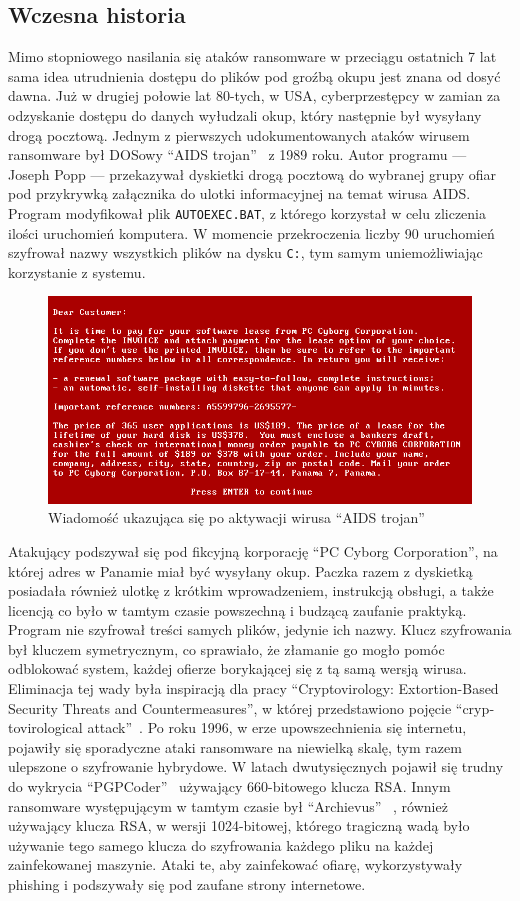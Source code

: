 \subsection{Wczesna historia}
Mimo stopniowego nasilania się ataków ransomware w przeciągu ostatnich 7 lat sama idea utrudnienia
dostępu do plików pod groźbą okupu jest znana od dosyć dawna. Już w drugiej połowie lat 80-tych, w USA,
cyberprzestępcy w zamian za odzyskanie dostępu do danych wyłudzali okup, który następnie był wysyłany drogą pocztową. Jednym z pierwszych udokumentowanych ataków wirusem ransomware był DOSowy \foreignquote{english}{AIDS trojan}~\cite{virus_1990} z 1989 roku. Autor programu — Joseph Popp — przekazywał dyskietki drogą pocztową do wybranej grupy ofiar pod przykrywką załącznika do ulotki informacyjnej na temat wirusa AIDS. Program modyfikował plik \texttt{AUTOEXEC.BAT}, z którego korzystał w celu zliczenia ilości uruchomień komputera. W momencie przekroczenia liczby 90 uruchomień szyfrował nazwy wszystkich plików na dysku \texttt{C:\/}, tym samym uniemożliwiając korzystanie z systemu.
\begin{figure}[H]
    \centering
    \includegraphics[width=0.6\linewidth]{rysunki/aids-trojan.png}
    \caption{Wiadomość ukazująca się po aktywacji wirusa \foreignquote{english}{AIDS trojan}}
    \label{fig:enter-label}
\end{figure}
Atakujący podszywał się pod fikcyjną korporację \foreignquote{english}{PC Cyborg Corporation}, na której adres w Panamie miał być wysyłany okup. Paczka razem z dyskietką posiadała również ulotkę z krótkim wprowadzeniem, instrukcją obsługi, a także licencją co było w tamtym czasie powszechną i budzącą zaufanie praktyką. 
Program nie szyfrował treści samych plików, jedynie ich nazwy. Klucz szyfrowania był kluczem symetrycznym, co sprawiało, że złamanie go mogło pomóc odblokować system, każdej ofierze borykającej się z tą samą wersją wirusa. Eliminacja tej wady była inspiracją dla pracy \foreignquote{english}{Cryptovirology: Extortion-Based Security Threats and Countermeasures}, w której przedstawiono pojęcie \foreignquote{english}{cryptovirological attack}~\cite{yung}.
\newline
Po roku 1996, w erze upowszechnienia się internetu, pojawiły się sporadyczne ataki ransomware na niewielką skalę, tym razem ulepszone o szyfrowanie hybrydowe. W latach dwutysięcznych pojawił się trudny do wykrycia \foreignquote{english}{PGPCoder}~\cite{tromer_cryptanalysis_nodate} używający 660-bitowego klucza RSA. Innym ransomware występującym w tamtym czasie był \foreignquote{english}{Archievus} ~\cite{arhiveus}, również używający klucza RSA, w wersji 1024-bitowej, którego tragiczną wadą było używanie tego samego klucza do szyfrowania każdego pliku na każdej zainfekowanej maszynie. Ataki te, aby zainfekować ofiarę, wykorzystywały phishing i podszywały się pod zaufane strony internetowe. 
